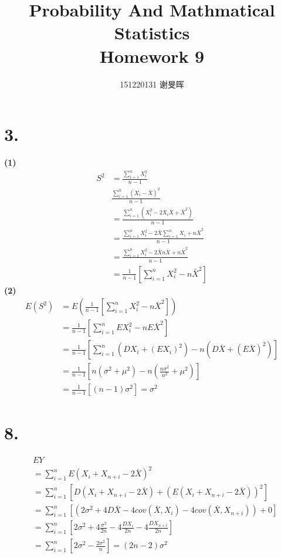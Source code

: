 \documentclass[a4paper,twocolumn]{ctexart}
\title{Probability And Mathmatical Statistics\\Homework 9}
\author{151220131 谢旻晖}
\date{}
\begin{document}
\maketitle
\section*{3.}
\noindent\textbf{(1)}\\
\begin{align*}
S^2&=\frac{\sum_{i=1}^{n}X_i^2}{n-1}\\
&\frac{\sum_{i=1}^{n}(X_i-\bar{X})^2}{n-1}\\
&=\frac{\sum_{i=1}^{n}(X_i^2-2X_i\bar{X}+\bar{X}^2)}{n-1}\\
&=\frac{\sum_{i=1}^{n}X_i^2-2\bar{X}\sum_{i=1}^{n}X_i+n\bar{X}^2}{n-1}\\
&=\frac{\sum_{i=1}^{n}X_i^2-2\bar{X}n\bar{X}+n\bar{X}^2}{n-1}\\
&=\frac{1}{n-1}\left[\sum_{i=1}^{n}X_i^2-n\bar{X}^2\right]
\end{align*}
\noindent\textbf{(2)}\\
\begin{align*}
E(S^2)&=E(\frac{1}{n-1}\left[\sum_{i=1}^{n}X_i^2-n\bar{X}^2\right])\\
&=\frac{1}{n-1}\left[\sum_{i=1}^{n}EX_i^2-nE\bar{X}^2\right]\\
&=\frac{1}{n-1}\left[\sum_{i=1}^{n}(DX_i+(EX_i)^2)-n\left(D\bar{X}+\left(E\bar{X}\right)^2\right)\right]\\
&=\frac{1}{n-1}\left[n(\sigma^2+\mu^2)-n\left(\frac{n\sigma^2}{n^2}+\mu^2\right)\right]\\
&=\frac{1}{n-1}\left[(n-1)\sigma^2\right]=\sigma^2
\end{align*}
\section*{8.}
\begin{align*}
&EY\\
&=\sum_{i=1}^{n}E\left(X_i+X_{n+i}-2\bar{X}\right)^2\\
&=\sum_{i=1}^{n}\left[
D\left(X_i+X_{n+i}-2\bar{X}\right)+\left(E\left(X_i+X_{n+i}-2\bar{X}\right)\right)^2
\right]\\
&=\sum_{i=1}^{n}\left[
\left(2\sigma^2+4D\bar{X}-4cov(\bar{X},X_i)-4cov(\bar{X},X_{n+i})\right)
+
0
\right]\\
&=\sum_{i=1}^{n}\left[
2\sigma^2+4\frac{\sigma^2}{2n}-4\frac{DX_i}{2n}-4\frac{DX_{n+i}}{2n}
\right]\\
&=\sum_{i=1}^{n}\left[2\sigma^2-\frac{2\sigma^2}{n}\right]=(2n-2)\sigma^2
\end{align*}
\end{document}
